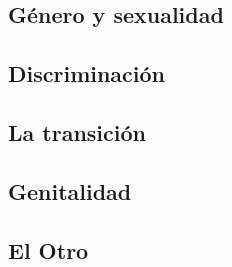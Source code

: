 \subsection{Género y sexualidad}
%
%
%
\subsection{Discriminación}
%
%
%
%
\subsection{La transición}
%
%
%
%
\subsection{Genitalidad}
%
%
%
\subsection{El Otro}
%
%
